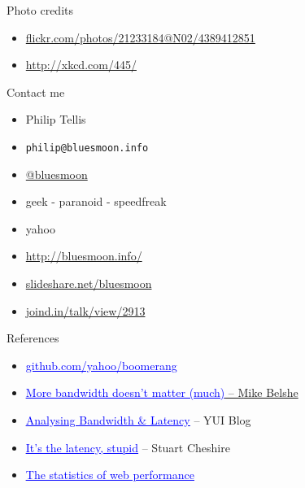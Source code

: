 \documentclass{beamer}
\begin{document}
\begin{frame}{Photo credits}
  \begin{itemize}
  \item \href{http://www.flickr.com/photos/21233184@N02/4389412851/}{flickr.com/photos/21233184@N02/4389412851}
  \item \href{http://xkcd.com/445/}{http://xkcd.com/445/}
  \end{itemize}
\end{frame}

\begin{frame}{Contact me}
  \begin{itemize}
  \item Philip Tellis
  \item \small{\texttt{philip@bluesmoon.info}}
  \item \href{http://twitter.com/bluesmoon}{@bluesmoon}
  \item geek - paranoid - speedfreak
  \item yahoo
  \item \href{http://bluesmoon.info/}{http://bluesmoon.info/}
  \item \href{http://www.slideshare.net/bluesmoon}{slideshare.net/bluesmoon}
  \item \href{http://joind.in/talk/view/2913}{joind.in/talk/view/2913}
  \end{itemize}
\end{frame}

\begin{frame}{References}
  \begin{itemize}
  \item \href{http://github.com/yahoo/boomerang/}{\textcolor{blue}{\underline{github.com/yahoo/boomerang}}}
  \item \href{http://www.belshe.com/2010/05/24/more-bandwidth-doesnt-matter-much/}{\textcolor{blue}{\underline{More bandwidth doesn't matter (much)}} -- Mike Belshe}
  \item \href{http://www.yuiblog.com/blog/2010/04/08/analyzing-bandwidth-and-latency/}{\textcolor{blue}{\underline{Analysing Bandwidth \& Latency}}} -- YUI Blog
  \item \href{http://www.stuartcheshire.org/rants/Latency.html}{\textcolor{blue}{\underline{It's the latency, stupid}}} -- Stuart Cheshire
  \item \href{http://www.slideshare.net/bluesmoon/index-3441823}{\textcolor{blue}{\underline{The statistics of web performance}}}
  \end{itemize}
\end{frame}
\end{document}
